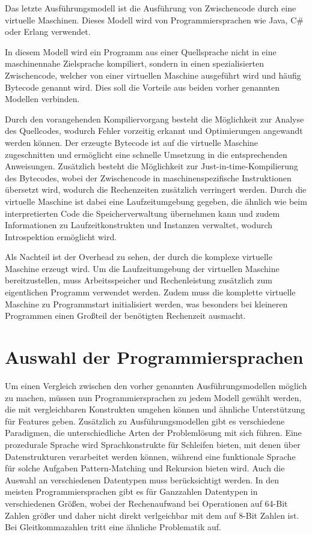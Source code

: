 \documentclass[11pt, parskip=half]{scrartcl}       %
\begin{document}
Das letzte Ausführungsmodell ist die Ausführung von Zwischencode durch eine virtuelle Maschinen.
Dieses Modell wird von Programmiersprachen wie Java, C\# oder Erlang verwendet.

In diesem Modell wird ein Programm aus einer Quellsprache nicht in eine maschinennahe Zielsprache kompiliert, sondern in einen spezialisierten Zwischencode, welcher von einer virtuellen Maschine ausgeführt wird und häufig Bytecode genannt wird.
Dies soll die Vorteile aus beiden vorher genannten Modellen verbinden.

Durch den vorangehenden Kompiliervorgang besteht die Möglichkeit zur Analyse des Quellcodes, wodurch Fehler vorzeitig erkannt und Optimierungen angewandt werden können.
Der erzeugte Bytecode ist auf die virtuelle Maschine zugeschnitten und ermöglicht eine schnelle Umsetzung in die entsprechenden Anweisungen.
Zusätzlich besteht die Möglichkeit zur Just-in-time-Kompilierung des Bytecodes, wobei der Zwischencode in maschinenspezifische Instruktionen übersetzt wird, wodurch die Rechenzeiten zusätzlich verringert werden.
Durch die virtuelle Maschine ist dabei eine Laufzeitumgebung gegeben, die ähnlich wie beim interpretierten Code die Speicherverwaltung übernehmen kann und zudem Informationen zu Laufzeitkonstrukten und Instanzen verwaltet, wodurch Introspektion ermöglicht wird.

Als Nachteil ist der Overhead zu sehen, der durch die komplexe virtuelle Maschine erzeugt wird.
Um die Laufzeitumgebung der virtuellen Maschine bereitzustellen, muss Arbeitsspeicher und Rechenleistung zusätzlich zum eigentlichen Programm verwendet werden.
Zudem muss die komplette virtuelle Maschine zu Programmstart initialisiert werden, was besonders bei kleineren Programmen einen Großteil der benötigten Rechenzeit ausmacht.\cite{arxiv_comparative_study_of_languages}


\section{Auswahl der Programmiersprachen}

Um einen Vergleich zwischen den vorher genannten Ausführungsmodellen möglich zu machen, müssen nun Programmiersprachen zu jedem Modell gewählt werden, die mit vergleichbaren Konstrukten umgehen können und ähnliche Unterstützung für Features geben.
Zusätzlich zu Ausführungsmodellen gibt es verschiedene Paradigmen, die unterschiedliche Arten der Problemlösung mit sich führen.
Eine prozedurale Sprache wird Sprachkonstrukte für Schleifen bieten, mit denen über Datenstrukturen verarbeitet werden können, während eine funktionale Sprache für solche Aufgaben Pattern-Matching und Rekursion bieten wird.
Auch die Auswahl an verschiedenen Datentypen muss berücksichtigt werden.
In den meisten Programmiersprachen gibt es für Ganzzahlen Datentypen in verschiedenen Größen, wobei der Rechenaufwand bei Operationen auf 64-Bit Zahlen größer und daher nicht direkt verlgeichbar mit dem auf 8-Bit Zahlen ist. Bei Gleitkommazahlen tritt eine ähnliche Problematik auf.
\end{document}
